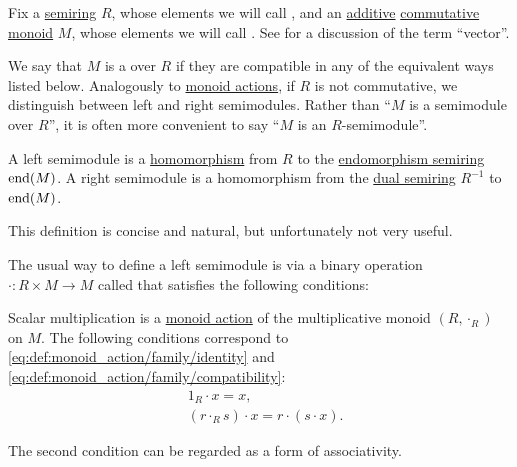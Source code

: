 \begin{definition}\label{def:semimodule}
  Fix a \hyperref[def:semiring]{semiring} \( R \), whose elements we will call , and an \hyperref[rem:additive_magma]{additive} \hyperref[def:magma/commutative]{commutative} \hyperref[def:monoid]{monoid} \( M \), whose elements we will call . See  for a discussion of the term \enquote{vector}.

  We say that \( M \) is a  over \( R \) if they are compatible in any of the equivalent ways listed below. Analogously to \hyperref[def:monoid_action]{monoid actions}, if \( R \) is not commutative, we distinguish between left and right semimodules. Rather than \enquote{\( M \) is a semimodule over \( R \)}, it is often more convenient to say \enquote{\( M \) is an \( R \)-semimodule}.

  \begin{thmenum}[series=def:semimodule]
     A left semimodule is a \hyperref[def:semiring/homomorphism]{homomorphism} from \( R \) to the \hyperref[def:endomorphism_semiring]{endomorphism semiring} \( \operatorname{end}(M) \). A right semimodule is a homomorphism from the \hyperref[def:semiring/opposite]{dual semiring} \( R^{-1} \) to \( \operatorname{end}(M) \).

    This definition is concise and natural, but unfortunately not very useful.

     The usual way to define a left semimodule is via a binary operation \( \cdot: R \times M \to M \) called  that satisfies the following conditions:
    \begin{thmenum}
       Scalar multiplication is a \hyperref[def:monoid_action]{monoid action} of the multiplicative monoid \( (R, \cdot_R) \) on \( M \). The following conditions correspond to \eqref{eq:def:monoid_action/family/identity} and \eqref{eq:def:monoid_action/family/compatibility}:
      \begin{align}
        &1_R \cdot x = x, \label{eq:def:semimodule/operation/scalar_multiplication_action/identity} \\
        &(r \cdot_R s) \cdot x = r \cdot (s \cdot x). \label{eq:def:semimodule/operation/scalar_multiplication_action/compatibility}
      \end{align}

      The second condition can be regarded as a form of associativity.


\end{thmenum}
\end{thmenum}
\end{definition}
